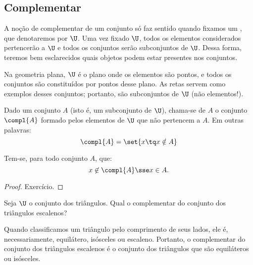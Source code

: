 \subsection{Complementar}
A noção de complementar de um conjunto só faz sentido quando fixamos um , que denotaremos por $\U$.
Uma vez fixado $\U$, todos os elementos considerados pertencerão a $\U$ e todos os conjuntos serão subconjuntos de $\U$.
Dessa forma, teremos bem esclarecidos quais objetos podem estar presentes nos conjuntos.

\begin{example}
Na geometria plana, $\U$ é o plano onde os elementos são pontos, e todos os conjuntos são constituídos por pontos desse plano.
As retas servem como exemplos desses conjuntos; portanto, são subconjuntos de $\U$ (não elementos!).
\end{example}

\begin{definition}[Complementar]
\label{def:complementar}
Dado um conjunto $A$ (isto é, um subconjunto de $\U$), chama-se  de $A$ o conjunto $\compl{A}$ formado pelos elementos de $\U$ que não pertencem a $A$.
Em outras palavras:
$$
\compl{A} = \set{x \tq x \notin A}
$$
\end{definition}

\begin{proposition}
\label{prop:def-complementar}
Tem-se, para todo conjunto $A$, que:
$$
x \not \in \compl{A} \sse x \in A.
$$
\end{proposition}

\begin{proof}
Exercício.
\end{proof}

\begin{example}
Seja $\U$ o conjunto dos triângulos.
Qual o complementar do conjunto dos triângulos escalenos?
\end{example}

\begin{solution}
	Quando classificamos um triângulo pelo comprimento de seus lados, ele é, necessariamente, equilátero, isósceles ou escaleno.
	Portanto, o complementar do conjunto dos triângulos escalenos é o conjunto dos triângulos que são equiláteros ou isósceles.
\end{solution}

